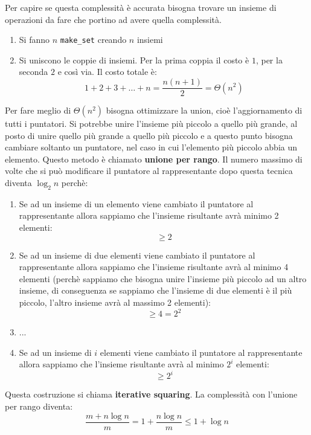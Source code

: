 \documentclass[a4paper]{article}
\begin{document}
\vspace{1em}
\noindent
Per capire se questa complessità è accurata bisogna trovare un insieme di operazioni
da fare che portino ad avere quella complessità.

\begin{enumerate}
  \item Si fanno \( n \) \texttt{make\_set} creando \( n \) insiemi
  \item Si uniscono le coppie di insiemi. Per la prima coppia il costo è \( 1 \),
    per la seconda \( 2 \) e così via. Il costo totale è:
    \[
      1 + 2 + 3 + \ldots + n = \frac{n(n+1)}{2} = \Theta(n^2)
    \] 
\end{enumerate}
Per fare meglio di \( \Theta (n ^2) \) bisogna ottimizzare la union, cioè l'aggiornamento
di tutti i puntatori. Si potrebbe unire l'insieme più piccolo a quello più grande,
al posto di unire quello più grande a quello più piccolo e a questo punto bisogna cambiare
soltanto un puntatore, nel caso in cui l'elemento più piccolo abbia un elemento.
Questo metodo è chiamato \textbf{unione per rango}.
Il numero massimo di volte che si può modificare il puntatore al rappresentante dopo
questa tecnica diventa \( \log_2 n \) perchè:
\begin{enumerate}
  \item Se ad un insieme di un elemento viene cambiato il puntatore al rappresentante
    allora sappiamo che l'insieme risultante avrà minimo 2 elementi:
    \[
    \ge 2
    \] 
  \item Se ad un insieme di due elementi viene cambiato il puntatore al rappresentante
    allora sappiamo che l'insieme risultante avrà al minimo 4 elementi (perchè sappiamo
    che bisogna unire l'insieme più piccolo ad un altro insieme, di conseguenza se
    sappiamo che l'insieme di due elementi è il più piccolo, l'altro insieme avrà
    al massimo 2 elementi):
    \[
    \ge 4 = 2^2
    \] 

  \item ...

  \item Se ad un insieme di \( i \) elementi viene cambiato il puntatore al rappresentante
    allora sappiamo che l'insieme risultante avrà al minimo \( 2^i \) elementi:
    \[
    \ge 2^i
    \]
\end{enumerate}
Questa costruzione si chiama \textbf{iterative squaring}.
\noindent
La complessità con l'unione per rango diventa:
\[
\frac{m + n \log n}{m} = 1 + \frac{n \log n}{m} \le  1 + \log n
\] 
\end{document}
